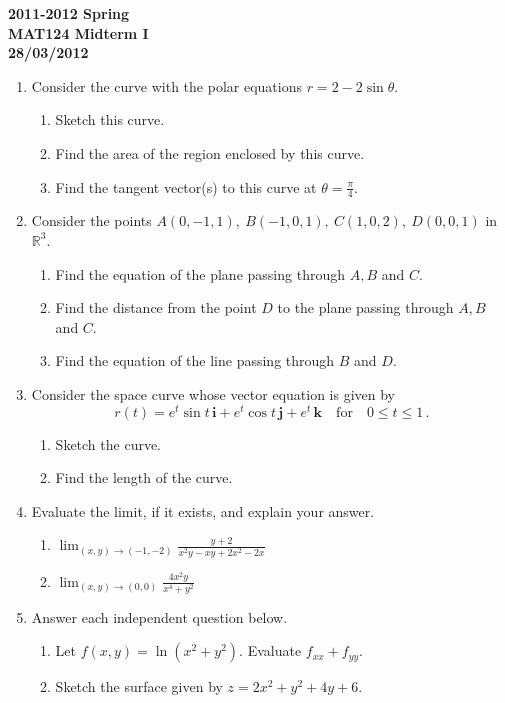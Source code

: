 \documentclass[a4paper, 12pt]{article}
\begin{document}
\begin{center}
\textbf{2011-2012 Spring \\MAT124 Midterm I\\28/03/2012}
\end{center}

\begin{enumerate}[leftmargin=*,label=\textbf{\arabic*.}]

\item Consider the curve with the polar equations $r=2-2\sin\theta$.
\begin{enumerate}[leftmargin=*,label=\textbf{\alph*.}]
\item Sketch this curve.
\item Find the area of the region enclosed by this curve.
\item Find the tangent vector(s) to this curve at $\displaystyle\theta=\frac\pi4$.
\end{enumerate}

\item Consider the points $A(0,-1,1),\:B(-1,0,1),\:C(1,0,2),\:D(0,0,1)$ in $\mathbb{R}^3$.
\begin{enumerate}[leftmargin=*,label=\textbf{\alph*.}]
\item Find the equation of the plane passing through $A, B$ and $C$.
\item Find the distance from the point $D$ to the plane passing through $A, B$ and $C$.
\item Find the equation of the line passing through $B$ and $D$.
\end{enumerate}

\item Consider the space curve whose vector equation is given by
\[r(t)= e ^t\sin t\,\mathbf{i}+ e ^t\cos t\,\mathbf{j}+ e ^t\,\mathbf{k} \quad\text{for}\quad 0\leq t\leq1\,.\]
\begin{enumerate}[leftmargin=*,label=\textbf{\alph*.}]
\item Sketch the curve.
\item Find the length of the curve.
\end{enumerate}

\item Evaluate the limit, if it exists, and explain your answer.
\begin{enumerate}[leftmargin=*,label=\textbf{\alph*.}]
\item $\displaystyle \lim_{(x,y)\to(-1,-2)}\frac{y+2}{x^2y-xy+2x^2-2x}$ \ \ \ \item $\displaystyle\lim_{(x,y)\to(0,0)}\frac{4x^2y}{x^4+y^2}$
\end{enumerate}

\item Answer each independent question below.
\begin{enumerate}[leftmargin=*,label=\textbf{\alph*.}]
\item Let $f(x,y)=\ln\left(x^2+y^2\right)$. Evaluate $f_{xx}+f_{yy}$.
\item Sketch the surface given by $z=2x^2+y^2+4y+6$.
\end{enumerate}
\end{enumerate}
\end{document}
